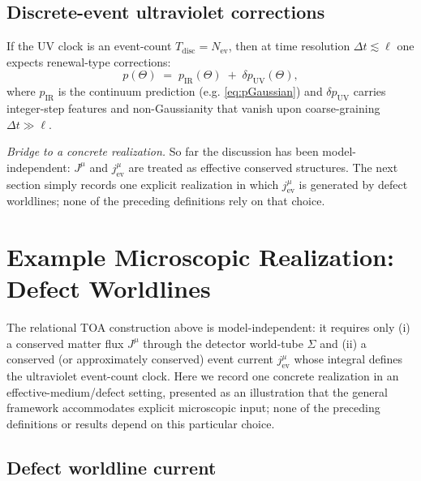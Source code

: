 \documentclass[pdflatex,sn-mathphys-num]{sn-jnl}
\theoremstyle{thmstylethree}
\theoremstyle{thmstyleone}
\theoremstyle{thmstyletwo}
\numberwithin{equation}{section}
\newcommand{\Nev}{N_{\mathrm{ev}}}
\begin{document}
    \subsection{Discrete-event ultraviolet corrections}
    
    If the UV clock is an event-count $T_{\mathrm{disc}}=\Nev$, then at time resolution $\Delta t \lesssim \ell$ one expects renewal-type corrections:
    \begin{equation}
        p(\Theta)\;=\;p_{\mathrm{IR}}(\Theta)\;+\;\delta p_{\mathrm{UV}}(\Theta),
    \end{equation}
    where $p_{\mathrm{IR}}$ is the continuum prediction (e.g. \eqref{eq:pGaussian}) and $\delta p_{\mathrm{UV}}$ carries integer-step features and non-Gaussianity that vanish upon coarse-graining $\Delta t\gg \ell$.
    
    \medskip
    \noindent
    \textit{Bridge to a concrete realization.}
    So far the discussion has been model-independent: $J^\mu$ and $j^\mu_{\mathrm{ev}}$ are treated as effective conserved structures. The next section simply records one explicit realization in which $j^\mu_{\mathrm{ev}}$ is generated by defect worldlines; none of the preceding definitions rely on that choice.

    \section{Example Microscopic Realization: Defect Worldlines}
    \label{sec:defectrealization}
    
    The relational TOA construction above is model-independent: it requires only (i) a conserved matter flux $J^\mu$ through the detector world-tube $\Sigma$ and (ii) a conserved (or approximately conserved) event current $j^\mu_{\mathrm{ev}}$ whose integral defines the ultraviolet event-count clock. Here we record one concrete realization in an effective-medium/defect setting, presented as an illustration that the general framework accommodates explicit microscopic input; none of the preceding definitions or results depend on this particular choice.
    
    \subsection{Defect worldline current}
        
\end{document}
